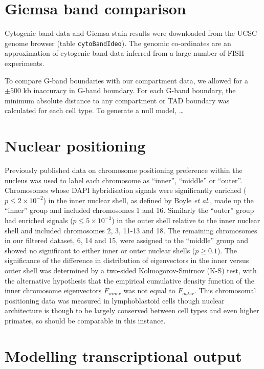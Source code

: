 \documentclass[a4paper,11pt,oneside]{book}
\begin{document}
\section{Giemsa band comparison}\label{giemsa-band-comparison}

Cytogenic band data and Giemsa stain results were downloaded from the
UCSC genome browser (table \texttt{cytoBandIdeo}). The genomic
co-ordinates are an approximation of cytogenic band data inferred from a
large number of FISH experiments.\citep{Furey2003}

To compare G-band boundaries with our compartment data, we allowed for a
$\pm 500$ kb inaccuracy in G-band boundary. For each G-band boundary,
the minimum absolute distance to any compartment or TAD boundary was
calculated for each cell type. To generate a null model, \ldots

\section{Nuclear positioning}\label{methods:positioning}
Previously published data  on chromosome positioning preference within
the nucleus was used to label each chromosome as ``inner'', ``middle''
or ``outer''.\cite{Boyle2001} Chromosomes whose DAPI hybridisation
signals were significantly enriched ($p\leq 2\times10^{-2}$) in the inner nuclear shell, as
defined by Boyle \emph{et al.}\cite{Boyle2001}, made up the ``inner''
group and included chromosomes 1 and 16. Similarly the ``outer'' group
had enriched signals ($p\leq 5\times10^{-3}$) in the outer shell relative to the inner nuclear
shell and included chromosomes 2, 3, 11-13 and 18. The remaining
chromosomes in our filtered dataset, 6, 14 and 15, were assigned to
the ``middle'' group and showed no significant to either inner or
outer nuclear shells ($p \geq 0.1$).\cite{Boyle2001} The significance
of the difference in distribution of eigenvectors in the inner
versus outer shell was determined by a two-sided Kolmogorov-Smirnov (K-S)
test, with the alternative hypothesis that the empirical cumulative
density function of the inner chromosome eigenvectors $F_{inner}$ was not equal to $F_{outer}$. This chromosomal positioning data was measured in lymphoblastoid
cells though nuclear architecture is though to be largely conserved
between cell types\cite{Chambers2013, DeWit2013} and even higher primates,\cite{Tanabe2002} so should be comparable in this instance.

\section{Modelling transcriptional output}
\end{document}
